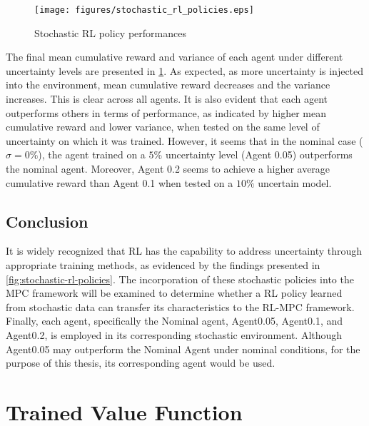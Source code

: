\begin{figure}[H]
    \centering
    \texttt{[image: figures/stochastic\_rl\_policies.eps]}
    \caption{Stochastic RL policy performances}
    \label{fig:stochastic-rl-policies}
\end{figure}

The final mean cumulative reward and variance of each agent under different uncertainty levels are presented in \ref{fig:stochastic-rl-policies}. As expected, as more uncertainty is injected into the environment, mean cumulative reward decreases and the variance increases. This is clear across all agents. It is also evident that each agent outperforms others in terms of performance, as indicated by higher mean cumulative reward and lower variance,  when tested on the same level of uncertainty on which it was trained. However, it seems that in the nominal case ($\sigma = 0\%$), the agent trained on a $5\%$ uncertainty level (Agent 0.05) outperforms the nominal agent. Moreover, Agent 0.2 seems to achieve a higher average cumulative reward than Agent 0.1 when tested on a $10\%$ uncertain model.

\subsection{Conclusion}
It is widely recognized that RL has the capability to address uncertainty through appropriate training methods, as evidenced by the findings presented in \autoref{fig:stochastic-rl-policies}. The incorporation of these stochastic policies into the MPC framework will be examined to determine whether a RL policy learned from stochastic data can transfer its characteristics to the RL-MPC framework. Finally, each agent, specifically the Nominal agent, Agent0.05, Agent0.1, and Agent0.2, is employed in its corresponding stochastic environment. Although Agent0.05 may outperform the Nominal Agent under nominal conditions, for the purpose of this thesis, its corresponding agent would be used.

\section{Trained Value Function}
\label{section:trained-vf}


